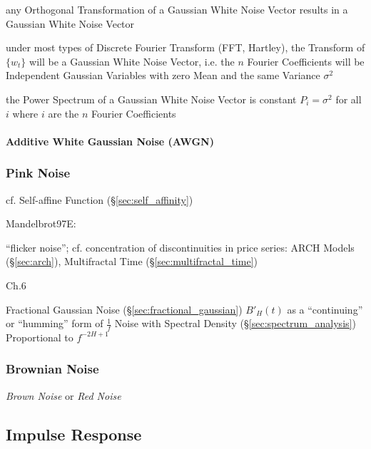 any Orthogonal Transformation of a Gaussian White Noise Vector results in a
Gaussian White Noise Vector

under most types of Discrete Fourier Transform (FFT, Hartley), the Transform of
$\{ w_t \}$ will be a Gaussian White Noise Vector, i.e. the $n$ Fourier
Coefficients will be Independent Gaussian Variables with zero Mean and the same
Variance $\sigma^2$

the Power Spectrum of a Gaussian White Noise Vector is constant $P_i = \sigma^2$
for all $i$ where $i$ are the $n$ Fourier Coefficients



\paragraph{Additive White Gaussian Noise (AWGN)}\label{sec:awgn}\hfill



\subsubsection{Pink Noise}\label{sec:pink_noise}

cf. Self-affine Function (\S\ref{sec:self_affinity})

Mandelbrot97E:

``flicker noise''; cf. concentration of discontinuities in price series: ARCH
Models (\S\ref{sec:arch}), Multifractal Time (\S\ref{sec:multifractal_time})

Ch.6

Fractional Gaussian Noise (\S\ref{sec:fractional_gaussian}) $B'_H(t)$ as a
``continuing'' or ``humming'' form of $\frac{1}{f}$ Noise with Spectral Density
(\S\ref{sec:spectrum_analysis}) Proportional to $f^{-2H+1}$



\subsubsection{Brownian Noise}\label{sec:brownian_noise}

\emph{Brown Noise} or \emph{Red Noise}



\subsection{Impulse Response}\label{sec:impulse_response}

